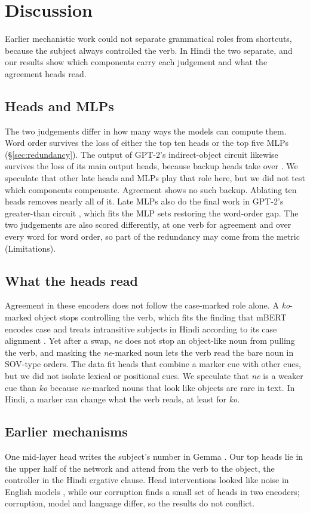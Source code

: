 \documentclass[11pt]{article}
\begin{document}
\section{Discussion}
\label{sec:discussion}

Earlier mechanistic work could not separate grammatical roles from shortcuts, because the subject always controlled the verb.
In Hindi the two separate, and our results show which components carry each judgement and what the agreement heads read.

\subsection{Heads and MLPs}
The two judgements differ in how many ways the models can compute them.
Word order survives the loss of either the top ten heads or the top five MLPs (\S\ref{sec:redundancy}).
The output of GPT-2's indirect-object circuit likewise survives the loss of its main output heads, because backup heads take over \citep{wang2023}.
We speculate that other late heads and MLPs play that role here, but we did not test which components compensate.
Agreement shows no such backup.
Ablating ten heads removes nearly all of it.
Late MLPs also do the final work in GPT-2's greater-than circuit \citep{hanna2023}, which fits the MLP sets restoring the word-order gap.
The two judgements are also scored differently, at one verb for agreement and over every word for word order, so part of the redundancy may come from the metric (Limitations).

\subsection{What the heads read}
Agreement in these encoders does not follow the case-marked role alone.
A \emph{ko}-marked object stops controlling the verb, which fits the finding that mBERT encodes case and treats intransitive subjects in Hindi according to its case alignment \citep{papadimitriou2021}.
Yet after a swap, \emph{ne} does not stop an object-like noun from pulling the verb, and masking the \emph{ne}-marked noun lets the verb read the bare noun in SOV-type orders.
The data fit heads that combine a marker cue with other cues, but we did not isolate lexical or positional cues.
We speculate that \emph{ne} is a weaker cue than \emph{ko} because \emph{ne}-marked nouns that look like objects are rare in text.
In Hindi, a marker can change what the verb reads, at least for \emph{ko}.

\subsection{Earlier mechanisms}
One mid-layer head writes the subject's number in Gemma \citep{ferrando2024}.
Our top heads lie in the upper half of the network and attend from the verb to the object, the controller in the Hindi ergative clause.
Head interventions looked like noise in English models \citep{finlayson2021}, while our corruption finds a small set of heads in two encoders; corruption, model and language differ, so the results do not conflict.
\end{document}
